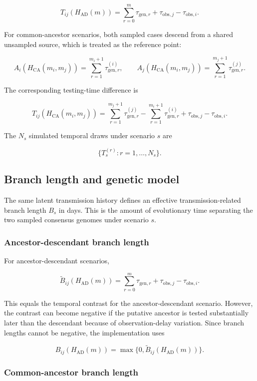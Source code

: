 \[
	T_{ij}(H_{\mathrm{AD}}(m)) =
	\sum_{r=0}^{m}\tau_{\mathrm{gen},r}
	+ \tau_{\mathrm{obs},j} - \tau_{\mathrm{obs},i}.
\]

For common-ancestor scenarios, both sampled cases descend from a shared unsampled source, which is treated as the reference point:

\[
	A_i(H_{\mathrm{CA}}(m_i,m_j)) =
	\sum_{r=1}^{m_i+1}\tau_{\mathrm{gen},r}^{(i)},
	\qquad
	A_j(H_{\mathrm{CA}}(m_i,m_j)) =
	\sum_{r=1}^{m_j+1}\tau_{\mathrm{gen},r}^{(j)}.
\]

The corresponding testing-time difference is

\[
	T_{ij}(H_{\mathrm{CA}}(m_i,m_j)) =
	\sum_{r=1}^{m_j+1}\tau_{\mathrm{gen},r}^{(j)}
	- \sum_{r=1}^{m_i+1}\tau_{\mathrm{gen},r}^{(i)}
	+ \tau_{\mathrm{obs},j} - \tau_{\mathrm{obs},i}.
\]

The $N_s$ simulated temporal draws under scenario $s$ are

\[
	\{T_s^{(r)} : r = 1,\ldots,N_s\}.
\]

\subsection{Branch length and genetic model}\label{sec:app_ch3_branch_length_genetic_model}

The same latent transmission history defines an effective transmission-related branch length $B_s$ in days. This is the amount of evolutionary time separating the two sampled consensus genomes under scenario $s$.

\subsubsection{Ancestor-descendant branch length}

For ancestor-descendant scenarios,

\[
	\widetilde{B}_{ij}(H_{\mathrm{AD}}(m)) =
	\sum_{r=0}^{m}\tau_{\mathrm{gen},r}
	+ \tau_{\mathrm{obs},j} - \tau_{\mathrm{obs},i}.
\]

This equals the temporal contrast for the ancestor-descendant scenario. However, the contrast can become negative if the putative ancestor is tested substantially later than the descendant because of observation-delay variation. Since branch lengths cannot be negative, the implementation uses

\[
	B_{ij}(H_{\mathrm{AD}}(m)) =
	\max\{0,\widetilde{B}_{ij}(H_{\mathrm{AD}}(m))\}.
\]

\subsubsection{Common-ancestor branch length}

